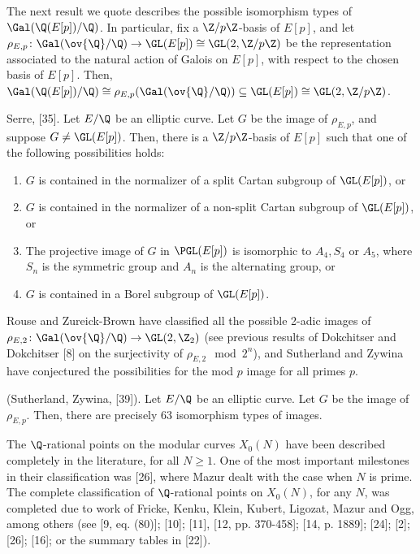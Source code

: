 The next result we quote describes the possible isomorphism types of $\Gal(\Q(E[p])/\Q)$. In particular, fix a $\Z/p\Z$-basis of $E[p]$, and let $\rho_{E,p} \colon \Gal(\ov{\Q}/\Q) \to \GL(E[p]) \cong \GL(2,\Z/p\Z)$ be the representation associated to the natural action of Galois on $E[p]$, with respect to the chosen basis of $E[p]$. Then, $\Gal(\Q(E[p])/\Q) \cong \rho_{E,p}(\Gal(\ov{\Q}/\Q)) \subseteq \GL(E[p]) \cong \GL(2,\Z/p\Z)$. 


\begin{thm} %
Serre, [35]. Let $E/\Q$ be an elliptic curve. Let $G$ be the image of $\rho_{E,p}$, and suppose $G \neq \GL(E[p])$. Then, there is a $\Z/p\Z$-basis of $E[p]$ such that one of the following possibilities holds:
	\begin{enumerate}[(1)]
	\item $G$ is contained in the normalizer of a split Cartan subgroup of $\GL(E[p])$, or
	\item $G$ is contained in the normalizer of a non-split Cartan subgroup of $\GL(E[p])$, or
	\item The projective image of $G$ in $\PGL(E[p])$ is isomorphic to $A_4, S_4$ or $A_5$, where $S_n$ is the symmetric group and $A_n$ is the alternating group, or
	\item $G$ is contained in a Borel subgroup of $\GL(E[p])$. 
	\end{enumerate}
\end{thm}


Rouse and Zureick-Brown have classified all the possible 2-adic images of $\rho_{E,2} \colon \Gal(\ov{\Q}/\Q) \to \GL(2,\Z_2)$ (see previous results of Dokchitser and Dokchitser [8] on the surjectivity of $\rho_{E,2} \mod 2^n$), and Sutherland and Zywina have conjectured the possibilities for the mod $p$ image for all primes $p$.


\begin{conj} %
(Sutherland, Zywina, [39]). Let $E/\Q$ be an elliptic curve. Let $G$ be the image of
$\rho_{E,p}$. Then, there are precisely 63 isomorphism types of images.
\end{conj}


The $\Q$-rational points on the modular curves $X_0(N)$ have been described completely in the literature, for all $N \geq 1$. One of the most important milestones in their classification was [26], where Mazur dealt with the case when $N$ is prime. The complete classification of $\Q$-rational points on $X_0(N)$, for any $N$, was completed due to work of Fricke, Kenku, Klein, Kubert, Ligozat, Mazur and Ogg, among others (see [9, eq. (80)]; [10]; [11], [12, pp. 370-458]; [14, p. 1889]; [24]; [2]; [26]; [16]; or the summary tables in [22]).


